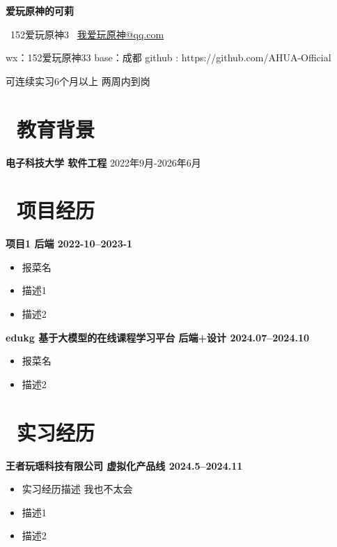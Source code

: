 \documentclass[11pt]{article}
\begin{document}
%
\centerline{\LARGE\bfseries{爱玩原神的可莉}}

\centerline{\normalsize{
		\faPhone \ 152爱玩原神3 \quad
		\faEnvelopeO \ \href{mailto:mxd@mail.bnu.edu.cn}{我爱玩原神@qq.com}}}

\centerline{\normalsize{wx：152爱玩原神33 \quad base：成都 \quad github : https://github.com/AHUA-Official }}
\centerline{\normalsize{可连续实习6个月以上 \quad 两周内到岗}}







\section{\makebox[\widthof{\faGraduationCap}][c]{\color{CVBlue}\faGraduationCap}\  教育背景}
\textbf{电子科技大学 \quad 软件工程 }           \hfill             2022年9月-2026年6月






\section{\makebox[\widthof{\faGraduationCap}][c]{\color{CVBlue}\faUsers}\ 项目经历}
\textbf{项目1             \hfill 后端  2022-10--2023-1\\       }
\begin{itemize}
    \item   报菜名 
	\item 描述1 
    \item 描述2  
\end{itemize}

\textbf{edukg  基于大模型的在线课程学习平台  \hfill 后端+设计  2024.07--2024.10\\}
\begin{itemize}
    \item 报菜名
    \item 描述2 
\end{itemize}


\section{\makebox[\widthof{\faGraduationCap}][c]{\color{CVBlue}\faUsers}\ 实习经历}
\textbf{王者玩瑶科技有限公司            \hfill 虚拟化产品线 2024.5--2024.11\\       }
\begin{itemize}
    \item  实习经历描述  我也不太会   
	\item 描述1 
    \item 描述2  
\end{itemize}
\end{document}
